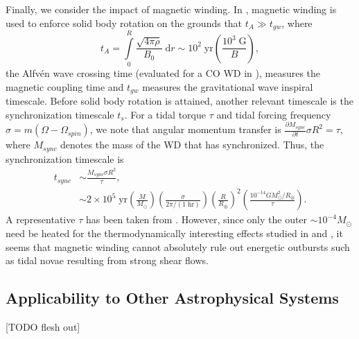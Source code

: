 \documentclass[
        fleqn,
        usenatbib,
    ]{mnras}
\newcommand*{\pd}[2]{\frac{\partial#1}{\partial#2}}
\newcommand*{\p}[1]{\left(#1\right)}
\begin{document}
Finally, we consider the impact of magnetic winding. In \citep{bukart}, magnetic
winding is used to enforce solid body rotation on the grounds that $t_A \gg
t_{gw}$, where
\begin{equation}
    t_A = \int\limits_0^R \frac{\sqrt{4\pi \rho}}{B_0}\;\mathrm{d}r
        \sim 10^2\;\mathrm{yr}\p{\frac{10^3\;\mathrm{G}}{B}},
\end{equation}
the Alfv\'en wave crossing time (evaluated for a CO WD in \citealp{fullerIV}),
measures the magnetic coupling time and $t_{gw}$ measures the gravitational wave
inspiral timescale. Before solid body rotation is attained, another relevant
timescale is the synchronization timescale $t_s$. For a tidal torque $\tau$ and
tidal forcing frequency $\sigma = m\p{\Omega - \Omega_{spin}}$, we note that
angular momentum transfer is $\pd{M_{sync}}{t} \sigma R^2 = \tau$, where
$M_{sync}$ denotes the mass of the WD that has synchronized. Thus, the
synchronization timescale is
\begin{align}
    t_{sync} &\sim \frac{M_{sync}\sigma R^2}{\tau},\\
        &\sim 2 \times 10^5\;\mathrm{yr}
            \p{\frac{M}{M_{\odot}}}
            \p{\frac{\sigma}{2\pi / (1\;\mathrm{hr})}}
            \p{\frac{R}{R_{\oplus}}}^2
            \p{\frac{10^{-14} GM_{\odot}^2/R_{\oplus}}{\tau}}.
\end{align}
A representative $\tau$ has been taken from \citep{bukart}. However, since only
the outer $\sim 10^{-4}M_{\odot}$ need be heated for the thermodynamically
interesting effects studied in \citep{fullerIV} and \citep{tidal_novae}, it
seems that magnetic winding cannot absolutely rule out energetic outbursts such
as tidal novae resulting from strong shear flows.

\subsection{Applicability to Other Astrophysical Systems}

[TODO flesh out]
\end{document}
